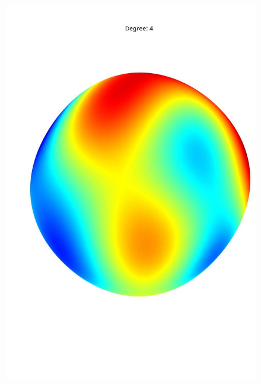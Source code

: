 \documentclass[a4paper]{article}
\theoremstyle{definition}
\begin{document}
\begin{figure}[h!]
\begin{minipage}{.245\textwidth}
        \includegraphics[width=0.95\linewidth]{media/med_4.jpg}
        \label{fig:med4}
    \end{minipage}
    \begin{minipage}{.245\textwidth}
        \centering

\end{minipage}
\end{figure}
\end{document}
